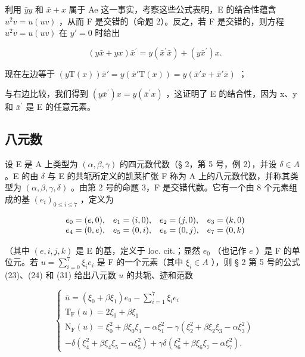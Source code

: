 利用 \(\bar{y}y\) 和 \(\bar{x} + x\) 属于 Ae 这一事实，考察这些公式表明，E 的结合性蕴含 \(u^{2}v = u(uv)\) ，从而 F 是交错的（命题 2）。反之，若 F 是交错的，则方程 \(u^{2}v = u(uv)\) 在 \(y' = 0\) 时给出

\[
(y \bar {x} + y x) \bar {x} ^ {\prime} = y (\bar {x} ^ {\prime} \bar {x}) + (y \bar {x} ^ {\prime}) x.
\]

现在左边等于 \((y\mathrm{T}(x))\bar{x}' = y(\bar{x}'\mathrm{T}(x)) = y(\bar{x}'x + \bar{x}'\bar{x})\) ；

与右边比较，我们得到 \((y\bar{x}^{\prime})x = y(\bar{x}^{\prime}x)\) ，这证明了 E 的结合性，因为 x、y 和 \(\bar{x}^{\prime}\) 是 E 的任意元素。

\subsection{八元数}

设 E 是 A 上类型为 \((\alpha, \beta, \gamma)\) 的四元数代数（§ 2，第 5 号，例 2），并设 \(\delta \in A\) 。E 的由 \(\delta\) 与 E 的共轭所定义的凯莱扩张 F 称为 A 上的八元数代数，并称其类型为 \((\alpha, \beta, \gamma, \delta)\) 。由第 2 号的命题 3，F 是交错代数。它有一个由 8 个元素组成的基 \((e_{i})_{0 \leq i \leq 7}\) ，定义为

\[
\begin{array}{l l l l} e _ {0} = (e, 0), & e _ {1} = (i, 0), & e _ {2} = (j, 0), & e _ {3} = (k, 0) \\ e _ {4} = (0, e), & e _ {5} = (0, i), & e _ {6} = (0, j), & e _ {7} = (0, k) \end{array}
\]

（其中 \((e, i, j, k)\) 是 E 的基，定义于 loc. cit.；显然 \(e_0\) （也记作 \(e\) ）是 F 的单位元。若 \(u = \sum_{i=0}^{7} \xi_i e_i\) 是 F 的一个元素（其中 \(\xi_i \in A\) ），则 § 2 第 5 号的公式 (23)、(24) 和 (31) 给出八元数 \(u\) 的共轭、迹和范数

\[
\left\{ \begin{array}{c} \bar {u} = (\xi_ {0} + \beta \xi_ {1}) e _ {0} - \sum_ {i = 1} ^ {7} \xi_ {i} e _ {i} \\ \mathrm{T} _ {\mathrm{F}} (u) = 2 \xi_ {0} + \beta \xi_ {1} \\ \mathrm{N} _ {\mathrm{F}} (u) = \xi_ {0} ^ {2} + \beta \xi_ {0} \xi_ {1} - \alpha \xi_ {1} ^ {2} - \gamma (\xi_ {2} ^ {2} + \beta \xi_ {2} \xi_ {3} - \alpha \xi_ {3} ^ {2}) \\ - \delta (\xi_ {4} ^ {2} + \beta \xi_ {4} \xi_ {5} - \alpha \xi_ {5} ^ {2}) + \gamma \delta (\xi_ {6} ^ {2} + \beta \xi_ {6} \xi_ {7} - \alpha \xi_ {7} ^ {2}). \end{array} \right.\tag{4}
\]

